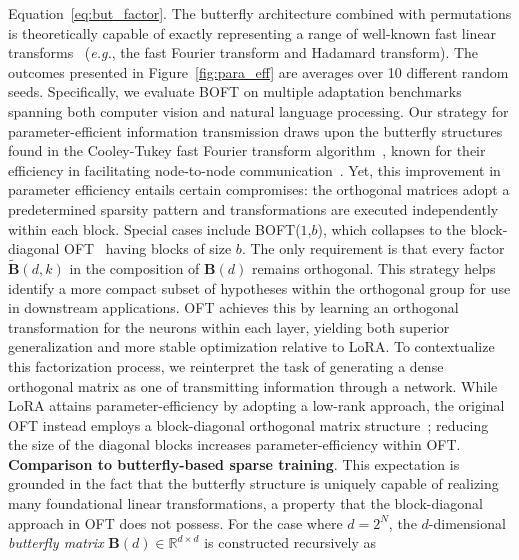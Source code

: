 Equation~\ref{eq:but_factor}. The butterfly architecture combined with permutations is theoretically capable of exactly representing a range of well-known fast linear transforms~\cite{dao2019learning,dao2019kaleidoscope} (\emph{e.g.}, the fast Fourier transform and Hadamard transform). The outcomes presented in Figure~\ref{fig:para_eff} are averages over 10 different random seeds. Specifically, we evaluate BOFT on multiple adaptation benchmarks spanning both computer vision and natural language processing. Our strategy for parameter-efficient information transmission draws upon the butterfly structures found in the Cooley-Tukey fast Fourier transform algorithm~\cite{cooley1965algorithm}, known for their efficiency in facilitating node-to-node communication~\cite{klasing1994broadcasting}. Yet, this improvement in parameter efficiency entails certain compromises: the orthogonal matrices adopt a predetermined sparsity pattern and transformations are executed independently within each block. Special cases include BOFT($1$,$b$), which collapses to the block-diagonal OFT~\cite{qiu2023controlling} having blocks of size $b$. The only requirement is that every factor $\tilde{\bm{B}}(d,k)$ in the composition of $\bm{B}(d)$ remains orthogonal. This strategy helps identify a more compact subset of hypotheses within the orthogonal group for use in downstream applications. OFT achieves this by learning an orthogonal transformation for the neurons within each layer, yielding both superior generalization and more stable optimization relative to LoRA. To contextualize this factorization process, we reinterpret the task of generating a dense orthogonal matrix as one of transmitting information through a network. While LoRA attains parameter-efficiency by adopting a low-rank approach, the original OFT instead employs a block-diagonal orthogonal matrix structure~\cite{qiu2023controlling}; reducing the size of the diagonal blocks increases parameter-efficiency within OFT. \textbf{Comparison to butterfly-based sparse training}. This expectation is grounded in the fact that the butterfly structure is uniquely capable of realizing many foundational linear transformations, a property that the block-diagonal approach in OFT does not possess. For the case where $d=2^N$, the $d$-dimensional \emph{butterfly matrix} $\bm{B}(d) \in \mathbb{R}^{d\times d}$ is constructed recursively as

